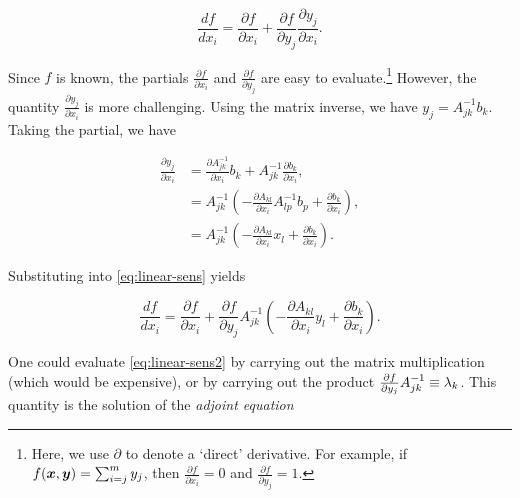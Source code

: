 \documentclass[../primer.tex]{subfiles}
\begin{document}
\begin{equation}\label{eq:linear-sens}
\frac{df}{dx_i} = \frac{\partial f}{\partial x_i} %
+ \frac{\partial f}{\partial y_j}\frac{\partial y_j}{\partial x_i}.
\end{equation}

\noindent Since \(f\) is known, the partials \(\frac{\partial f}{\partial x_i}\) and
\(\frac{\partial f}{\partial y_j}\) are easy to evaluate.\footnote{Here, we use
\(\partial\) to denote a `direct' derivative. For example, if
\(f(\boldsymbol{x},\boldsymbol{y})=\sum_{i=j}^my_j\), then \(\frac{\partial f}{\partial x_i}=0\) and
\(\frac{\partial f}{\partial y_j}=1\).} However, the quantity \(\frac{\partial
y_j}{\partial x_i}\) is more challenging. Using the matrix inverse, we have
\(y_j=A_{jk}^{-1}b_k\). Taking the partial, we have\footnotemark


\begin{equation}\begin{aligned}
\frac{\partial y_j}{\partial x_i} &= \frac{\partial A^{-1}_{jk}}{\partial x_i}b_k + A^{-1}_{jk}\frac{\partial b_k}{\partial x_i}, \\
&= A^{-1}_{jk}\left(-\frac{\partial A_{kl}}{\partial x_i}A^{-1}_{lp}b_p+\frac{\partial b_k}{\partial x_i}\right), \\
&= A^{-1}_{jk}\left(-\frac{\partial A_{kl}}{\partial x_i}x_l+\frac{\partial b_k}{\partial x_i}\right).
\end{aligned}\end{equation}


\noindent Substituting into \eqref{eq:linear-sens} yields

\begin{equation}\label{eq:linear-sens2}
\frac{df}{dx_i} = \frac{\partial f}{\partial x_i} + \frac{\partial f}{\partial y_j}A^{-1}_{jk}%
\left(-\frac{\partial A_{kl}}{\partial x_i}y_l + \frac{\partial b_k}{\partial x_i}\right).
\end{equation}

One could evaluate \eqref{eq:linear-sens2} by carrying out the matrix
multiplication (which would be expensive), or by carrying out the product
\(\frac{\partial f}{\partial y_j}A^{-1}_{jk}\equiv\nobreak\lambda_k\). This
quantity is the solution of the \emph{adjoint equation}
\end{document}
